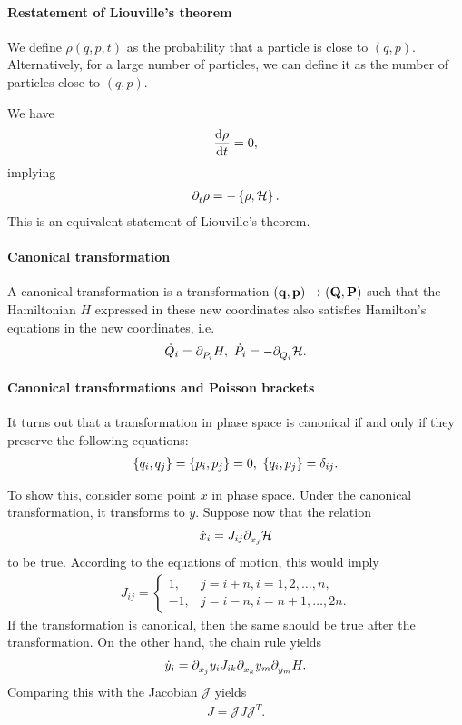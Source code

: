 \paragraph{Restatement of Liouville's theorem}
We define $\rho(q, p, t)$ as the probability that a particle is close to $(q, p)$. Alternatively, for a large number of particles, we can define it as the number of particles close to $(q, p)$.

We have
\begin{align*}
	\dv{\rho}{t} = 0,
\end{align*}
implying
\begin{align*}
	\partial^{}_{t}\rho = -\left\{\rho, \mathcal{H}\right\}.
\end{align*}
This is an equivalent statement of Liouville's theorem.

\paragraph{Canonical transformation}
A canonical transformation is a transformation $(\vb{q}, \vb{p})\to (\vb{Q}, \vb{P})$ such that the Hamiltonian $H$ expressed in these new coordinates also satisfies Hamilton's equations in the new coordinates, i.e.
\begin{align*}
	\dot{Q}_{i} = \partial^{}_{P_{i}}H,\ \dot{P}_{i} = -\partial^{}_{Q_{i}}\mathcal{H}.
\end{align*}

\paragraph{Canonical transformations and Poisson brackets}
It turns out that a transformation in phase space is canonical if and only if they preserve the following equations:
\begin{align*}
	\left\{q_{i}, q_{j}\right\} = \left\{p_{i}, p_{j}\right\} = 0,\ \left\{q_{i}, p_{j}\right\} = \delta_{ij}.
\end{align*}

To show this, consider some point $x$ in phase space. Under the canonical transformation, it transforms to $y$. Suppose now that the relation
\begin{align*}
	\dot{x}_{i} = J_{ij}\partial^{}_{x_{j}}\mathcal{H}
\end{align*}
to be true. According to the equations of motion, this would imply
\begin{align*}
	J_{ij} = 
	\begin{cases}
		 1, &j = i + n, i = 1, 2, \dots, n, \\
		-1, &j = i - n, i = n + 1, \dots, 2n.
	\end{cases}
\end{align*}
If the transformation is canonical, then the same should be true after the transformation. On the other hand, the chain rule yields
\begin{align*}
	\dot{y}_{i} = \partial^{}_{x_{j}}y_{i}J_{ik}\partial^{}_{x_{k}}y_{m}\partial^{}_{y_{m}}H.
\end{align*}
Comparing this with the Jacobian $\mathcal{J}$ yields
\begin{align*}
	J = \mathcal{J}J\mathcal{J}^{T}.
\end{align*}